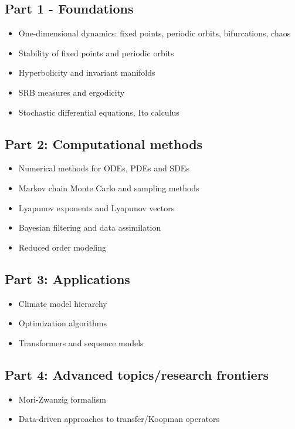 \documentclass[12pt]{article}
\begin{document}
\subsection*{Part 1 - Foundations}

\begin{itemize}
	\item One-dimensional dynamics: fixed points, periodic orbits, bifurcations, chaos
	\item Stability of fixed points and periodic orbits
	\item Hyperbolicity and invariant manifolds
	\item SRB measures and ergodicity
	\item Stochastic differential equations, Ito calculus

\end{itemize}
\subsection*{Part 2: Computational methods}
\begin{itemize}
	\item Numerical methods for ODEs, PDEs and SDEs
	\item Markov chain Monte Carlo and sampling methods
	\item Lyapunov exponents and Lyapunov vectors
	\item Bayesian filtering and data assimilation
	\item Reduced order modeling
\end{itemize}

\subsection*{Part 3: Applications}
\begin{itemize}
	\item Climate model hierarchy
	\item Optimization algorithms
	\item Transformers and sequence models
\end{itemize}

\subsection*{Part 4: Advanced topics/research frontiers}
\begin{itemize}
	\item Mori-Zwanzig formalism
	\item Data-driven approaches to transfer/Koopman operators
\end{itemize}
\end{document}
